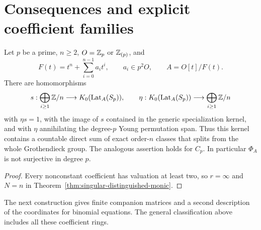 \section{Consequences and explicit coefficient families}
\label{sec:monic-depth-two-split}

\begin{corollary}\label{thm:monic-depth-two-split}
Let $p$ be a prime, $n\ge2$, $O=\mathbb Z_p$ or $\mathbb Z_{(p)}$, and
\[
 F(t)=t^n+\sum_{i=0}^{n-1}a_it^i,\qquad a_i\in p^2O,
 \qquad A=O[t]/F(t).
\]
There are homomorphisms
\[
 s:\bigoplus_{i\ge1}\mathbb Z/n\longrightarrow K_0(\operatorname{Lat}_A(S_p)),
 \qquad
 \eta:K_0(\operatorname{Lat}_A(S_p))\longrightarrow\bigoplus_{i\ge1}\mathbb Z/n
\]
with $\eta s=1$, with the image of $s$ contained in the generic
specialization kernel, and with $\eta$ annihilating the degree-$p$
Young permutation span.  Thus this kernel contains a countable
direct sum of exact order-$n$ classes that splits from the whole
Grothendieck group.  The analogous assertion holds for $C_p$.
In particular $\Phi_A$ is not surjective in degree $p$.
\end{corollary}


\begin{proof}
Every nonconstant coefficient has valuation at least two, so
\(r=\infty\) and \(N=n\) in
Theorem~\ref{thm:singular-distinguished-monic}.
\end{proof}

The next construction gives finite companion matrices and a second
description of the coordinates for binomial equations.  The general
classification above includes all these coefficient rings.
